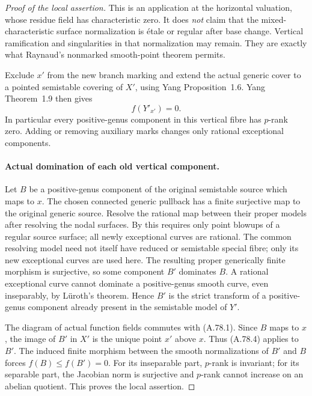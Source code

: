 \begin{proof}[Proof of the local assertion]
This is an application at the horizontal valuation, whose
residue field has characteristic zero. It does \emph{not}
claim that the mixed-characteristic surface normalization
is \'etale or regular after base change. Vertical ramification
and singularities in that normalization may remain.
They are exactly what Raynaud's nonmarked smooth-point
theorem permits.

Exclude \(x'\) from the new branch marking and extend the
actual generic cover to a pointed semistable covering of
\(X'\), using Yang Proposition~1.6. Yang Theorem~1.9
then gives
\[
                    f(Y'_{x'})=0.                        \tag{A.78.4}
\]
In particular every positive-genus component in this
vertical fibre has \(p\)-rank zero. Adding or removing
auxiliary marks changes only rational exceptional components.

\paragraph{Actual domination of each old vertical component.}
Let \(B\) be a positive-genus component of the original
semistable source which maps to \(x\). The chosen connected
generic pullback has a finite surjective map to the original
generic source. Resolve the rational map between their proper
models after resolving the nodal surfaces. By \cite[Lemma 54.4.3, Tag 0C5H]{fghStacksKummerModels} this requires
only point blowups of a regular source surface; all newly
exceptional curves are rational. The common resolving model
need not itself have reduced or semistable special fibre;
only its new exceptional curves are used here. The resulting proper
generically finite morphism is surjective, so some component
\(B'\) dominates \(B\). A rational exceptional curve
cannot dominate a positive-genus smooth curve, even
inseparably, by L\"uroth's theorem. Hence \(B'\) is the
strict transform of a positive-genus component already
present in the semistable model of \(Y'\).

The diagram of actual function fields commutes with (A.78.1).
Since \(B\) maps to \(x\), the image of \(B'\) in
\(X'\) is the unique point \(x'\) above \(x\).
Thus (A.78.4) applies to \(B'\). The induced finite morphism
between the smooth normalizations of \(B'\) and \(B\)
forces \(f(B)\le f(B')=0\). For its inseparable part,
\(p\)-rank is invariant; for its separable part, the
Jacobian norm is surjective and \(p\)-rank cannot increase
on an abelian quotient. This proves the local assertion.
\end{proof}

